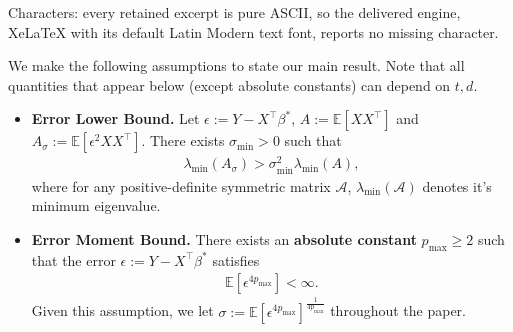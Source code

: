 \documentclass[10pt,a4paper]{amsart}
\begin{document}
Characters: every retained excerpt is pure ASCII, so the delivered engine, XeLaTeX with its default Latin Modern text font, reports no missing character.
\begin{assumption}\label{assump} We make the following assumptions to state our main result. Note that all quantities that appear below (except absolute constants) can depend on $t,d$.
\begin{itemize}[leftmargin=0.3in]
\item[(i)] \textbf{Error Lower Bound.} Let $\epsilon:= Y - X^\top \beta^*$, $A := \mathbb{E}[XX^\top]$ and $A_{\sigma} := \mathbb{E}[\epsilon^2 XX^\top]$. There exists $\sigma_{\min} > 0$ such that
\begin{align*}
    \lambda_{\min}(A_{\sigma}) > \sigma^2_{\min} \lambda_{\min}(A),
\end{align*}
where for any positive-definite symmetric matrix $\mathcal A$, $\lambda_{\min}(\mathcal A)$ denotes it's minimum eigenvalue. 
\item[(ii)] \textbf{Error Moment Bound.} There exists an \textbf{absolute constant} $p_{\max} \geq 2$ such that the error $\epsilon := Y - X^\top \beta^*$ satisfies
\begin{align*}
\mathbb{E}[\epsilon^{4p_{\max}}] < \infty.
\end{align*}
Given this assumption, we let $\sigma := \mathbb{E}[\epsilon^{4p_{\max}}]^{\frac{1}{4p_{\max}}}$ throughout the paper. 


\end{itemize}
\end{assumption}
\end{document}
